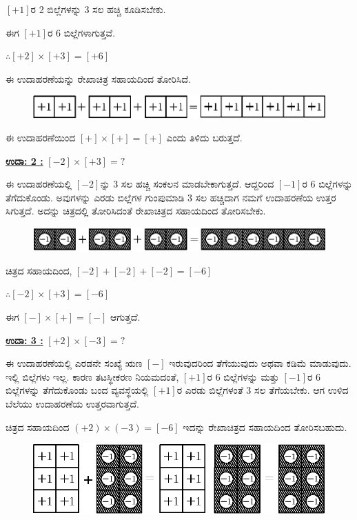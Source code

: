$[+1]$ರ 2 ಬಿಲ್ಲೆಗಳನ್ನು 3 ಸಲ ಹಚ್ಚಿ ಕೂಡಿಸಬೇಕು.

ಈಗ $[+1]$ರ 6 ಬಿಲ್ಲೆಗಳಾಗುತ್ತವೆ.

$\therefore [+2] \times [+3] = [+6]$

ಈ ಉದಾಹರಣೆಯನ್ನು ರೇಖಾಚಿತ್ರ ಸಹಾಯದಿಂದ ತೋರಿಸಿದೆ. 
\begin{figure}[H]
\centering
\includegraphics[scale=0.8]{src/figure/chap3/fig3-18b.eps}
\end{figure} 

ಈ ಉದಾಹರಣೆಯಿಂದ $[+] \times [+] = [+]$ ಎಂದು ತಿಳಿದು ಬರುತ್ತದೆ.

\noindent
{\textbf{\underline{ಉದಾ: 2 :}}} $[-2] \times [+3] = ?$

ಈ ಉದಾಹರಣೆಯಲ್ಲಿ $[-2]$ನ್ನು 3 ಸಲ ಹಚ್ಚಿ ಸಂಕಲನ ಮಾಡಬೇಕಾಗುತ್ತದೆ. ಆದ್ದರಿಂದ $[-1]$ರ 6 ಬಿಲ್ಲೆಗಳನ್ನು ತೆಗೆದುಕೊಂಡು. ಅವುಗಳನ್ನು ಎರಡು ಬಿಲ್ಲೆಗಳ ಗುಂಪುಮಾಡಿ 3 ಸಲ ಹಚ್ಚಿದಾಗ ನಮಗೆ ಉದಾಹರಣೆಯ ಉತ್ತರ ಸಿಗುತ್ತದೆ. ಅದನ್ನು ಚಿತ್ರದಲ್ಲಿ ತೋರಿಸಿದಂತೆ  ರೇಖಾಚಿತ್ರದ ಸಹಾಯದಿಂದ ತೋರಿಸಬೇಕು.
\begin{figure}[H]
\centering
\includegraphics[scale=0.8]{src/figure/chap3/fig3-19.eps}\\
\end{figure}

ಚಿತ್ರದ ಸಹಾಯದಿಂದ, $[-2] + [-2] + [-2] = [-6]$

$\therefore [-2] \times [+3] = [-6]$

ಈಗ $[-] \times [+] = [-]$ ಆಗುತ್ತದೆ.

\noindent
{\textbf{\underline{ಉದಾ: 3 :}}} $[+2] \times [-3] = ?$

ಈ ಉದಾಹರಣೆಯಲ್ಲಿ ಎರಡನೇ ಸಂಖ್ಯೆ ಋಣ $[-]$ ಇರುವುದರಿಂದ ತೆಗೆಯುವುದು ಅಥವಾ ಕಡಿಮೆ ಮಾಡುವುದು. ಇಲ್ಲಿ ಬಿಲ್ಲೆಗಳು ಇಲ್ಲ. ಕಾರಣ ತಟಸ್ಥೀಕರಣ ನಿಯಮದಂತೆ, $[+1]$ರ 6 ಬಿಲ್ಲೆಗಳನ್ನು ಮತ್ತು $[-1]$ರ 6 ಬಿಲ್ಲೆಗಳನ್ನು ತೆಗೆದುಕೊಂಡು ಬಂದ ವ್ಯವಸ್ಥೆಯಲ್ಲಿ $[+1]$ರ ಎರಡು ಬಿಲ್ಲೆಗಳಂತೆ 3 ಸಲ ತೆಗೆಯಬೇಕು. ಆಗ ಉಳಿದ ಬೆಲೆಯು ಉದಾಹರಣೆಯ ಉತ್ತರವಾಗುತ್ತದೆ.

ಚಿತ್ರದ ಸಹಾಯದಿಂದ $(+2) \times (-3) = [-6]$ ಇದನ್ನು ರೇಖಾಚಿತ್ರದ ಸಹಾಯದಿಂದ ತೋರಿಸಬಹುದು. 
\begin{figure}[H]
\centering
\includegraphics[scale=0.8]{src/figure/chap3/fig3-20b.eps}
\end{figure}

